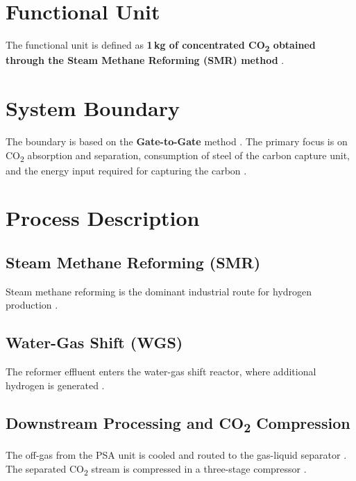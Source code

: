 \documentclass[12pt, a4paper]{report}
\begin{document}
\chapter{Functional Unit}
The functional unit is defined as \textbf{1\,kg of concentrated CO\textsubscript{2} obtained through the Steam Methane Reforming (SMR) method} \cite{Dufour,Rubin}.

\chapter{System Boundary}
The boundary is based on the \textbf{Gate-to-Gate} method \cite{ISO14040}. The primary focus is on CO\textsubscript{2} absorption and separation, consumption of steel of the carbon capture unit, and the energy input required for capturing the carbon \cite{Rubin}.

\chapter{Process Description}
\section{Steam Methane Reforming (SMR)}
Steam methane reforming is the dominant industrial route for hydrogen production \cite{RostrupNielsen1993,RostrupNielsen2011}.

\section{Water-Gas Shift (WGS)}
The reformer effluent enters the water-gas shift reactor, where additional hydrogen is generated \cite{Haussinger2011,Newsome1980}.

\section{Downstream Processing and CO\textsubscript{2} Compression}
The off-gas from the PSA unit is cooled and routed to the gas-liquid separator \cite{RostrupNielsen2011,Sircar2000}. The separated CO\textsubscript{2} stream is compressed in a three-stage compressor \cite{IPCC2005,Wang2011}.
\end{document}
